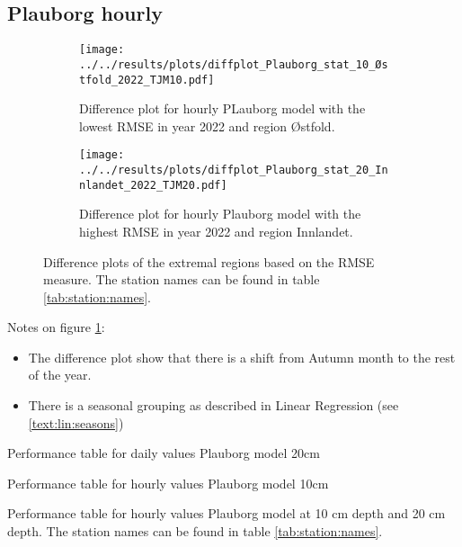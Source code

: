\subsection{Plauborg hourly}

\begin{figure}
	\begin{subfigure}{0.45\textwidth}
		\centering
		\texttt{[image: ../../results/plots/diffplot\_Plauborg\_stat\_10\_Østfold\_2022\_TJM10.pdf]}
		\caption[Difference plot of hourly PLauborg model with lowest RMSE]{Difference plot for hourly PLauborg model with the lowest RMSE in year 2022 and region Østfold.}
	\end{subfigure}
	\begin{subfigure}{0.45\textwidth}
		\centering
		\texttt{[image: ../../results/plots/diffplot\_Plauborg\_stat\_20\_Innlandet\_2022\_TJM20.pdf]}
		\caption[Difference plot of hourly Plauborg model with highest RMSE]{Difference plot for hourly Plauborg model with the highest RMSE in year 2022 and region Innlandet.}
	\end{subfigure}
		\caption[Difference plots of extremal regions hourly Plauborg]{Difference plots of the extremal regions based on the RMSE measure. The station names can be found in table \ref{tab:station:names}.}
		\label{fig:plauborg:hour:bestworst}
\end{figure}

Notes on figure \ref{fig:plauborg:hour:bestworst}:
\begin{itemize}
	\item The difference plot show that there is a shift from Autumn month to the rest of the year.
	\item There is a seasonal grouping as described in Linear Regression (see \ref{text:lin:seasons})
\end{itemize}

\begin{table}
	\begin{subtable}{0.8\textwidth}
		
		\caption{Performance table for daily values Plauborg model 20cm}
	\end{subtable}
	\begin{subtable}{0.8\textwidth}
		
		\caption{Performance table for hourly values Plauborg model 10cm}
	\end{subtable}
	\caption{Performance table for hourly values Plauborg model at 10 cm depth and 20 cm depth. The station names can be found in table \ref{tab:station:names}.}
	\label{tab:plauborg:hour:performance}
\end{table}


